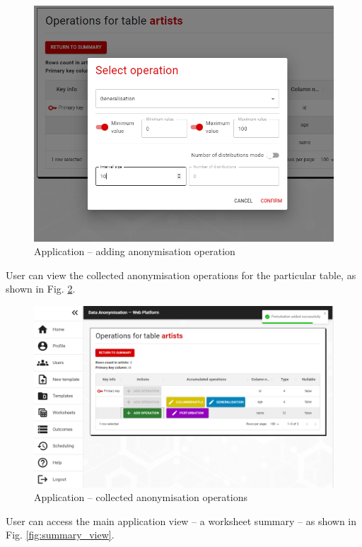 \documentclass[a4paper,twoside,12pt]{book}
\begin{document}
\begin{figure}
  \centering
  \includegraphics[width=\linewidth]{img/generalisation_view.png}
  \caption{Application -- adding anonymisation operation}
  \label{fig:generalisation_view}
\end{figure}

User can view the collected anonymisation operations for the particular table, as shown in Fig. \ref{fig:app_view}.

\begin{figure}
  \centering
  \includegraphics[width=\linewidth]{img/app_view.png}
  \caption{Application -- collected anonymisation operations}
  \label{fig:app_view}
\end{figure}

User can access the main application view -- a worksheet summary -- as shown in Fig. \ref{fig:summary_view}.
\end{document}
